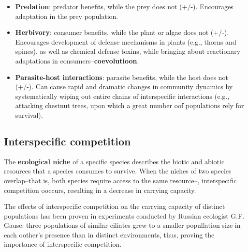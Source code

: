 \documentclass{article}
\begin{document}
\begin{itemize}
	\item \textbf{Predation}: predator benefits, while the prey does not (+/-). Encourages adaptation in the
	prey population.
	\item \textbf{Herbivory}: consumer benefits, while the plant or algae does not (+/-). Encourages
	development of defense mechanisms in plants (e.g., thorns and spines), as well as chemical defense toxins,
	while bringing about reactionary adaptations in consumers--\textbf{coevolutioon}.
	\item \textbf{Parasite-host interactions}: parasite benefits, while the host does not (+/-). Can cause
	rapid and dramatic changes in community dynamics by systematically wiping out entire chains of
	interspecific interactions (e.g., attacking chestnut trees, upon which a great number oof populations
	rely for survival).
\end{itemize}

\subsection{Interspecific competition}

The \textbf{ecological niche} of a specific species describes the biotic and abiotic resources that a species
consumes to survive. When the niches of two species overlap--that is, both species require access to the same
resource--, interspecific competition ooccurs, resulting in a decrease in carrying capacity.

The effects of interspecific competition on the carrying capacity of distinct populations has been proven in
experiments conducted by Russian ecologist G.F. Gause: three populations of similar ciliates grew to a smaller
popullation size in each oother's presence than in distinct environments, thus, proving the importance of
interspecific competition.
\end{document}
